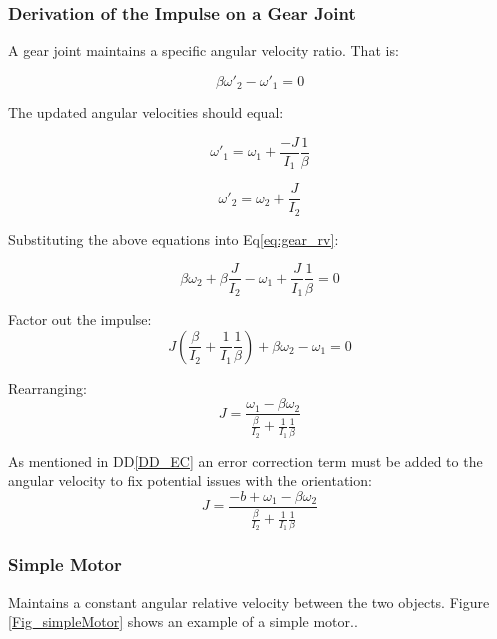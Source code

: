 \documentclass[12pt]{article}
\begin{document}
\subsubsection{Derivation of the Impulse on a Gear Joint}
A gear joint maintains a specific angular velocity ratio. That is: 

\begin{equation}
\beta \omega'_\text{2} -  \omega'_\text{1} = 0 \label{eq:gear_rv}
\end{equation}

\noindent 
The updated angular velocities should equal:

\begin{equation*}
 \omega'_\text{1} =   \omega_\text{1} + \frac{-J}{I_\text{1}}\frac{1}{\beta}
  \end{equation*}
  
\begin{equation*}
  \omega'_\text{2}  =  \omega_\text{2} +   \frac{J}{I_\text{2}}
  \end{equation*}

 
 \noindent 
 Substituting the above equations into Eq\ref{eq:gear_rv}:
 
\begin{equation*}
  \beta \omega_\text{2} +   \beta \frac{J}{I_\text{2}} -
   \omega_\text{1} + \frac{J}{I_\text{1}}\frac{1}{\beta} = 0
 \end{equation*}
 
 \noindent 
 Factor out the impulse:
\begin{equation*}
 J(\frac{\beta}{I_\text{2}} + \frac{1}{I_\text{1}}\frac{1}{\beta}) +
  \beta \omega_\text{2}  -
   \omega_\text{1} = 0
 \end{equation*}
 
 \noindent 
 Rearranging: 
 \begin{equation*}
 J = \frac{  \omega_\text{1}  -   \beta  \omega_\text{2}}
  {\frac{\beta}{I_\text{2}} + \frac{1}{I_\text{1}}\frac{1}{\beta}}
 \end{equation*}
 
\noindent
As mentioned in DD\ref{DD_EC} an error correction term must be added to the
angular velocity to fix potential issues with the orientation:
 \begin{equation*}
 J = \frac{-b +  \omega_\text{1}  -   \beta  \omega_\text{2}}
  {\frac{\beta}{I_\text{2}} + \frac{1}{I_\text{1}}\frac{1}{\beta}}
 \end{equation*}
 
 
\subsubsection{Simple Motor} \label{SecConstraintFig}
 Maintains a constant angular relative velocity between the two objects. 
Figure \ref{Fig_simpleMotor} shows an example of a simple motor..
~\newline
\end{document}
